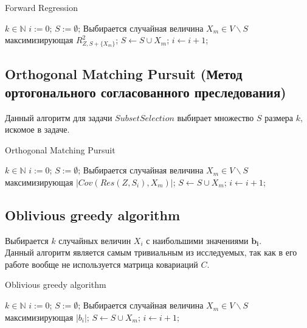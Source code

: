 \documentclass[preprint,12pt]{elsarticle}
\begin{document}
\begin{algorithm}[H]
\caption{Forward Regression}\label{algo::fg1}
\begin{algorithmic}[1]
\Require $k \in \mathbb{N}$
\State $i := 0$;
\State $S := \emptyset$;
\State Выбирается случайная величина $X_m \in V \backslash S$ максимизирующая $R_{Z, S + \{X_m\}}^{2}$;
\State $S \gets S \cup X_m$;
\State $i \gets i + 1$;
\EndWhile
\end{algorithmic}
\end{algorithm}

\subsection{Orthogonal Matching Pursuit (Метод ортогонального согласованного преследования)}
Данный алгоритм для задачи $Subset Selection$ выбирает множество $S$ размера $k$, искомое в задаче. 

\begin{algorithm}[H]
\caption{Orthogonal Matching Pursuit}\label{algo::fg2}
\begin{algorithmic}[1]
\Require $k \in \mathbb{N}$
\State $i := 0$;
\State $S := \emptyset$;
\State Выбирается случайная величина $X_m \in V \backslash S$ максимизирующая $|Cov(Res(Z, S_i), X_m)|$;
\State $S \gets S \cup X_m$;
\State $i \gets i + 1$;
\EndWhile
\end{algorithmic}
\end{algorithm}


\subsection{Oblivious greedy algorithm}
Выбирается $k$ случайных величин $X_i$ с наибольшими значениями $\mathbf{b_i}$.\\

Данный алгоритм является самым тривиальным из исследуемых, так как в его работе вообще не используется матрица ковариаций $C$.

\begin{algorithm}[H]
\caption{Oblivious greedy algorithm}\label{algo::obg}
\begin{algorithmic}[1]
\Require $k \in \mathbb{N}$
\State $i := 0$;
\State $S := \emptyset$;
\State Выбирается случайная величина $X_m \in V \backslash S$ максимизирующая $|b_i|$;
\State $S \gets S \cup X_m$;
\State $i \gets i + 1$;
\EndWhile
\end{algorithmic}
\end{algorithm}
\end{document}
